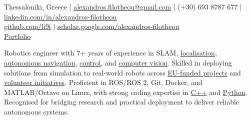 \documentclass[a4paper,10pt,twoside]{article}
\begin{document}

\par{\bigskip\par}

\begin{center}
{\footnotesize Thessaloniki, Greece $|$ \href{mailto:alexandros.filotheou@gmail.com}{alexandros.filotheou@gmail.com} $|$ (+30) 693 8787 677 $|$ \href{https://www.linkedin.com/in/alexandros-filotheou-5b6a8676/}{linkedin.com/in/alexandros-filotheou} \\ \href{https://github.com/li9i/}{github.com/li9i} $|$  \href{https://scholar.google.com/citations?hl=en&user=9_hI4hMAAAAJ&view_op=list_works}{scholar.google.com/alexandros-filotheou} \\ \href{https://mozilla.github.io/pdf.js/web/viewer.html?file=https://raw.githubusercontent.com/li9i/portfolio/master/portfolio.pdf}{Portfolio} \\}\vspace{1em}
\end{center}

\vspace{-0.5cm}
\begin{bw_box} \small
  Robotics engineer with 7+ years of experience in SLAM, \href{https://github.com/li9i/fsm-lo}{localisation}, \href{https://link.springer.com/article/10.1007/s10846-019-01086-y}{autonomous navigation}, \href{https://www.tandfonline.com/doi/full/10.1080/00207179.2018.1514129}{control}, and \href{https://github.com/li9i/pandora\_vision\_2014}{computer vision}. Skilled in deploying solutions from simulation to real-world robots across \href{https://www.robetarme-project.eu/}{EU-funded projects} and \href{https://issel.ee.auth.gr/pandora-robotics/}{volunteer initiatives}. Proficient in ROS/ROS 2, Git, Docker, and MATLAB/Octave on Linux, with strong coding expertise in \href{https://github.com/li9i/fsm}{C++} and \href{https://github.com/cultureid-auth-ros-packages/cultureid-waypoints-following}{Python}. Recognised for bridging research and practical deployment to deliver reliable autonomous systems.
\end{bw_box}
\end{document}
